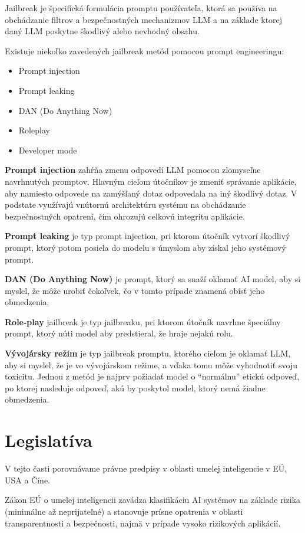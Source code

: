 Jailbreak je špecifická formulácia promptu používateľa, ktorá sa používa na obchádzanie filtrov a bezpečnostných mechanizmov LLM a na základe ktorej daný LLM poskytne škodlivý alebo nevhodný obsahu.

Existuje niekoľko zavedených jailbreak metód pomocou prompt engineeringu:
\begin{itemize}
    \item Prompt injection
    \item Prompt leaking
    \item DAN (Do Anything Now)
    \item Roleplay
    \item Developer mode
\end{itemize}

\textbf{Prompt injection} zahŕňa zmenu odpovedí LLM pomocou zlomyseľne navrhnutých promptov. Hlavným cieľom útočníkov je zmeniť správanie aplikácie, aby namiesto odpovede na zamýšľaný dotaz odpovedala na iný škodlivý dotaz. V podstate využívajú vnútornú architektúru systému na obchádzanie bezpečnostných opatrení, čím ohrozujú celkovú integritu aplikácie.

\textbf{Prompt leaking} je typ prompt injection, pri ktorom útočník vytvorí škodlivý prompt, ktorý potom posiela do modelu s úmyslom aby získal jeho systémový prompt.

\textbf{DAN (Do Anything Now)} je prompt, ktorý sa snaží oklamať AI model, aby si myslel, že môže urobiť čokoľvek, čo v tomto prípade znamená obísť jeho obmedzenia.

\textbf{Role-play} jailbreak je typ jailbreaku, pri ktorom útočník navrhne špeciálny prompt, ktorý núti model aby predstieral, že hraje nejakú rolu.

\textbf{Vývojársky režim} je typ jailbreak promptu, ktorého cieľom je oklamať LLM, aby si myslel, že je vo vývojárskom režime, a vďaka tomu môže vyhodnotiť svoju toxicitu. Jednou z metód je najprv požiadať model o ``normálnu'' etickú odpoveď, po ktorej nasleduje odpoveď, akú by poskytol model, ktorý nemá žiadne obmedzenia.

\section*{Legislatíva \label{sec:legislation_resume}}

V tejto časti porovnávame právne predpisy v oblasti umelej inteligencie v EÚ, USA a Číne.

Zákon EÚ o umelej inteligencii zavádza klasifikáciu AI systémov na základe rizika (minimálne až neprijateľné) a stanovuje prísne opatrenia v oblasti transparentnosti a bezpečnosti, najmä v prípade vysoko rizikových aplikácií.

